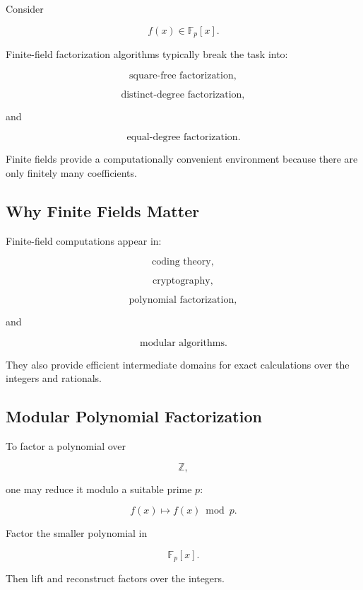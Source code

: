 Consider

\[
f(x)
\in
\mathbb{F}_p[x].
\]

Finite-field factorization algorithms typically break the task into:

\[
\boxed{
\text{square-free factorization},
}
\]

\[
\boxed{
\text{distinct-degree factorization},
}
\]

and

\[
\boxed{
\text{equal-degree factorization}.
}
\]

Finite fields provide a computationally convenient environment because
there are only finitely many coefficients.

\subsection{Why Finite Fields Matter}
\label{subsec:why-finite-fields-computer-algebra}

Finite-field computations appear in:

\[
\boxed{
\text{coding theory},
}
\]

\[
\boxed{
\text{cryptography},
}
\]

\[
\boxed{
\text{polynomial factorization},
}
\]

and

\[
\boxed{
\text{modular algorithms}.
}
\]

They also provide efficient intermediate domains for exact calculations
over the integers and rationals.

\subsection{Modular Polynomial Factorization}
\label{subsec:modular-polynomial-factorization}

To factor a polynomial over

\[
\mathbb{Z},
\]

one may reduce it modulo a suitable prime \(p\):

\[
\boxed{
f(x)
\mapsto
f(x)\bmod p.
}
\]

Factor the smaller polynomial in

\[
\mathbb{F}_p[x].
\]

Then lift and reconstruct factors over the integers.

